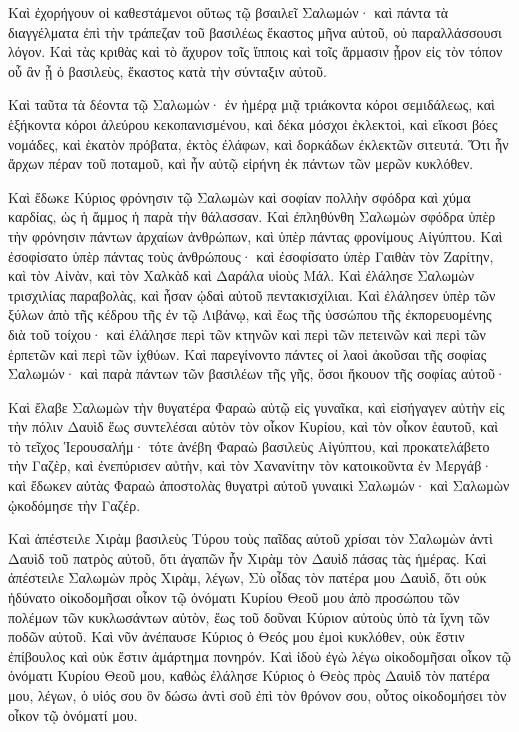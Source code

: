 {Καὶ ἐχορήγουν οἱ καθεστάμενοι οὕτως τῷ βσαιλεῖ Σαλωμών· καὶ πάντα τὰ διαγγέλματα ἐπὶ τὴν τράπεζαν τοῦ βασιλέως ἕκαστος μῆνα αὐτοῦ, οὐ παραλλάσσουσι λόγον. Καὶ τὰς κριθὰς καὶ τὸ ἄχυρον τοῖς ἵπποις καὶ τοῖς ἅρμασιν ᾖρον εἰς τὸν τόπον οὗ ἂν ᾖ ὁ βασιλεὺς, ἕκαστος κατὰ τὴν σύνταξιν αὐτοῦ.
\par }{\PP {}Καὶ ταῦτα τὰ δέοντα τῷ Σαλωμών· ἐν ἡμέρᾳ μιᾷ τριάκοντα κόροι σεμιδάλεως, καὶ ἑξήκοντα κόροι ἀλεύρου κεκοπανισμένου,
καὶ δέκα μόσχοι ἐκλεκτοὶ, καὶ εἴκοσι βόες νομάδες, καὶ ἑκατὸν πρόβατα, ἐκτὸς ἐλάφων, καὶ δορκάδων ἐκλεκτῶν σιτευτά.
Ὅτι ἦν ἄρχων πέραν τοῦ ποταμοῦ, καὶ ἦν αὐτῷ εἰρήνη ἐκ πάντων τῶν μερῶν κυκλόθεν.
\par }{\PP {}Καὶ ἔδωκε Κύριος φρόνησιν τῷ Σαλωμὼν καὶ σοφίαν πολλὴν σφόδρα καὶ χύμα καρδίας, ὡς ἡ ἄμμος ἡ παρὰ τὴν θάλασσαν.
Καὶ ἐπληθύνθη Σαλωμὼν σφόδρα ὑπὲρ τὴν φρόνησιν πάντων ἀρχαίων ἀνθρώπων, καὶ ὑπὲρ πάντας φρονίμους Αἰγύπτου.
Καὶ ἐσοφίσατο ὑπὲρ πάντας τοὺς ἀνθρώπους· καὶ ἐσοφίσατο ὑπὲρ Γαιθὰν τὸν Ζαρίτην, καὶ τὸν Αἰνὰν, καὶ τὸν Χαλκὰδ καὶ Δαράλα υἱοὺς Μάλ.
Καὶ ἐλάλησε Σαλωμὼν τρισχιλίας παραβολὰς, καὶ ἦσαν ᾠδαὶ αὐτοῦ πεντακισχίλιαι.
Καὶ ἐλάλησεν ὑπὲρ τῶν ξύλων ἀπὸ τῆς κέδρου τῆς ἐν τῷ Λιβάνῳ, καὶ ἕως τῆς ὑσσώπου τῆς ἐκπορευομένης διὰ τοῦ τοίχου· καὶ ἐλάλησε περὶ τῶν κτηνῶν καὶ περὶ τῶν πετεινῶν καὶ περὶ τῶν ἑρπετῶν καὶ περὶ τῶν ἰχθύων.
Καὶ παρεγίνοντο πάντες οἱ λαοὶ ἀκοῦσαι τῆς σοφίας Σαλωμών· καὶ παρὰ πάντων τῶν βασιλέων τῆς γῆς, ὅσοι ἤκουον τῆς σοφίας αὐτοῦ·
\par }{\PP {}Καὶ ἔλαβε Σαλωμὼν τὴν θυγατέρα Φαραὼ αὐτῷ εἰς γυναῖκα, καὶ εἰσήγαγεν αὐτὴν εἰς τὴν πόλιν Δαυὶδ ἕως συντελέσαι αὐτὸν τὸν οἶκον Κυρίου, καὶ τὸν οἶκον ἑαυτοῦ, καὶ τὸ τεῖχος Ἱερουσαλήμ·
τότε ἀνέβη Φαραὼ βασιλεὺς Αἰγύπτου, καὶ προκατελάβετο τὴν Γαζὲρ, καὶ ἐνεπύρισεν αὐτὴν, καὶ τὸν Χανανίτην τὸν κατοικοῦντα ἐν Μεργάβ· καὶ ἔδωκεν αὐτὰς Φαραὼ ἀποστολὰς θυγατρὶ αὐτοῦ γυναικὶ Σαλωμών· καὶ Σαλωμὼν ᾠκοδόμησε τὴν Γαζέρ.
\par }{\PP {}Καὶ ἀπέστειλε Χιρὰμ βασιλεὺς Τύρου τοὺς παῖδας αὐτοῦ χρίσαι τὸν Σαλωμὼν ἀντὶ Δαυὶδ τοῦ πατρὸς αὐτοῦ, ὅτι ἀγαπῶν ἦν Χιρὰμ τὸν Δαυὶδ πάσας τὰς ἡμέρας.
Καὶ ἀπέστειλε Σαλωμὼν πρὸς Χιρὰμ, λέγων,
Σὺ οἶδας τὸν πατέρα μου Δαυὶδ, ὅτι οὐκ ἠδύνατο οἰκοδομῆσαι οἶκον τῷ ὀνόματι Κυρίου Θεοῦ μου ἀπὸ προσώπου τῶν πολέμων τῶν κυκλωσάντων αὐτὸν, ἕως τοῦ δοῦναι Κύριον αὐτοὺς ὑπὸ τὰ ἴχνη τῶν ποδῶν αὐτοῦ.
Καὶ νῦν ἀνέπαυσε Κύριος ὁ Θεός μου ἐμοὶ κυκλόθεν, οὐκ ἔστιν ἐπίβουλος καὶ οὐκ ἔστιν ἁμάρτημα πονηρόν.
Καὶ ἰδοὺ ἐγὼ λέγω οἰκοδομῆσαι οἶκον τῷ ὀνόματι Κυρίου Θεοῦ μου, καθὼς ἐλάλησε Κύριος ὁ Θεὸς πρὸς Δαυὶδ τὸν πατέρα μου, λέγων, ὁ υἱός σου ὃν δώσω ἀντὶ σοῦ ἐπὶ τὸν θρόνον σου, οὗτος οἰκοδομήσει τὸν οἶκον τῷ ὀνόματί μου.
}
